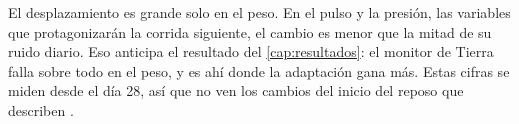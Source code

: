\begin{clave}
El desplazamiento es grande solo en el peso. En el pulso y la presión, las variables que protagonizarán la corrida
siguiente, el cambio es menor que la mitad de su ruido diario. Eso anticipa el resultado del \cref{cap:resultados}: el
monitor de Tierra falla sobre todo en el peso, y es ahí donde la adaptación gana más. Estas cifras se miden desde el
día 28, así que no ven los cambios del inicio del reposo que describen \textcite{meck2009}.
\end{clave}

